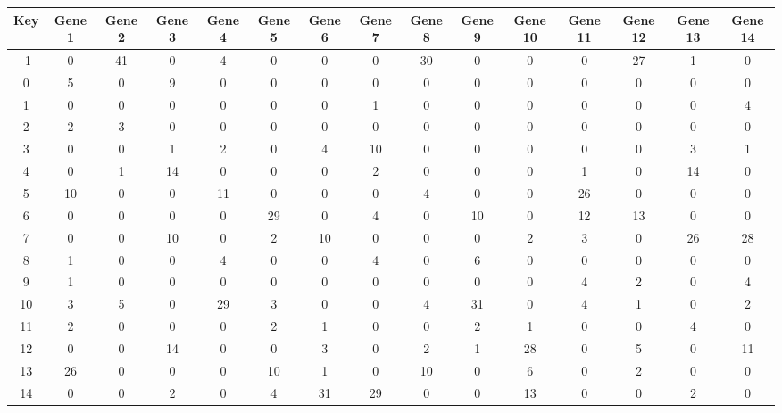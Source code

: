 \begin{tabular}{|c|c|c|c|c|c|c|c|c|c|c|c|c|c|c|}
\hline
Key & Gene 1 & Gene 2 & Gene 3 & Gene 4 & Gene 5 & Gene 6 & Gene 7 & Gene 8 & Gene 9 & Gene 10 & Gene 11 & Gene 12 & Gene 13 & Gene 14 \\
\hline
-1 & 0 & 41 & 0 & 4 & 0 & 0 & 0 & 30 & 0 & 0 & 0 & 27 & 1 & 0 \\
0 & 5 & 0 & 9 & 0 & 0 & 0 & 0 & 0 & 0 & 0 & 0 & 0 & 0 & 0 \\
1 & 0 & 0 & 0 & 0 & 0 & 0 & 1 & 0 & 0 & 0 & 0 & 0 & 0 & 4 \\
2 & 2 & 3 & 0 & 0 & 0 & 0 & 0 & 0 & 0 & 0 & 0 & 0 & 0 & 0 \\
3 & 0 & 0 & 1 & 2 & 0 & 4 & 10 & 0 & 0 & 0 & 0 & 0 & 3 & 1 \\
4 & 0 & 1 & 14 & 0 & 0 & 0 & 2 & 0 & 0 & 0 & 1 & 0 & 14 & 0 \\
5 & 10 & 0 & 0 & 11 & 0 & 0 & 0 & 4 & 0 & 0 & 26 & 0 & 0 & 0 \\
6 & 0 & 0 & 0 & 0 & 29 & 0 & 4 & 0 & 10 & 0 & 12 & 13 & 0 & 0 \\
7 & 0 & 0 & 10 & 0 & 2 & 10 & 0 & 0 & 0 & 2 & 3 & 0 & 26 & 28 \\
8 & 1 & 0 & 0 & 4 & 0 & 0 & 4 & 0 & 6 & 0 & 0 & 0 & 0 & 0 \\
9 & 1 & 0 & 0 & 0 & 0 & 0 & 0 & 0 & 0 & 0 & 4 & 2 & 0 & 4 \\
10 & 3 & 5 & 0 & 29 & 3 & 0 & 0 & 4 & 31 & 0 & 4 & 1 & 0 & 2 \\
11 & 2 & 0 & 0 & 0 & 2 & 1 & 0 & 0 & 2 & 1 & 0 & 0 & 4 & 0 \\
12 & 0 & 0 & 14 & 0 & 0 & 3 & 0 & 2 & 1 & 28 & 0 & 5 & 0 & 11 \\
13 & 26 & 0 & 0 & 0 & 10 & 1 & 0 & 10 & 0 & 6 & 0 & 2 & 0 & 0 \\
14 & 0 & 0 & 2 & 0 & 4 & 31 & 29 & 0 & 0 & 13 & 0 & 0 & 2 & 0 \\
\hline
\end{tabular}
